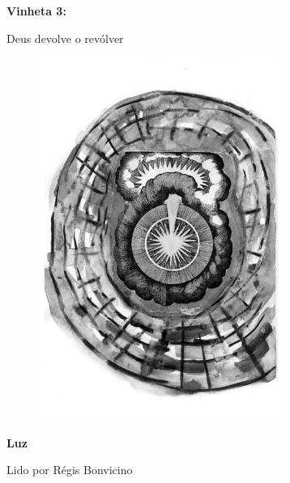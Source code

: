 \pagebreak

\begin{absolutelynopagebreak}
\textbf{Vinheta 3:}

Deus devolve o revólver


\begin{vplace}
\begin{figure}[H]
\begin{adjustwidth}{10.1cm}{}
  \vspace*{5cm}
  \includegraphics[width=80mm]{./imgs/caparc4.jpg}  
\end{adjustwidth}

\end{figure}
\end{vplace}

\end{absolutelynopagebreak}

\pagebreak

\textbf{Luz}

Lido por Régis Bonvicino

